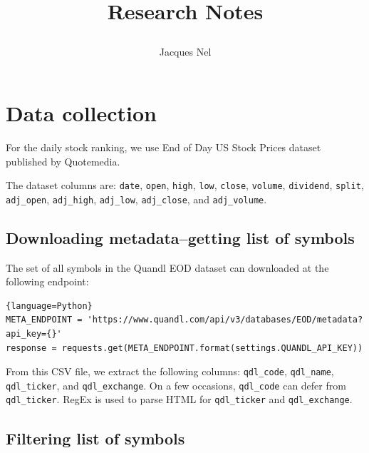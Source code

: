 \documentclass[8pt,oneside]{book}
\title{{\bf Research Notes}\\\vspace{10pt}     
    \author{Jacques Nel}
}
\begin{document}
\maketitle

\chapter{Data collection}

For the daily stock ranking, we use End of Day US Stock Prices dataset published by Quotemedia.

The dataset columns are:
\texttt{date},
\texttt{open},
\texttt{high},
\texttt{low},
\texttt{close},
\texttt{volume},
\texttt{dividend},
\texttt{split},
\texttt{adj\_open},
\texttt{adj\_high},
\texttt{adj\_low},
\texttt{adj\_close}, and
\texttt{adj\_volume}.

\section{Downloading metadata--getting list of symbols}

The set of all symbols in the Quandl EOD dataset can downloaded at the following endpoint:

\begin{lstlisting}{language=Python}
META_ENDPOINT = 'https://www.quandl.com/api/v3/databases/EOD/metadata?api_key={}'
response = requests.get(META_ENDPOINT.format(settings.QUANDL_API_KEY))
\end{lstlisting}

From this CSV file, we extract the following columns: \texttt{qdl\_code},
\texttt{qdl\_name}, \texttt{qdl\_ticker}, and \texttt{qdl\_exchange}. On a few
occasions, \texttt{qdl\_code} can defer from \texttt{qdl\_ticker}. RegEx is used to parse HTML for
\texttt{qdl\_ticker} and \texttt{qdl\_exchange}.

\section{Filtering list of symbols}
\end{document}
